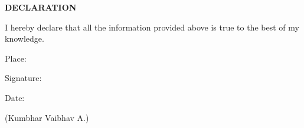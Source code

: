 \documentclass{article}
\begin{document}
\begin{framed}
	\large{\textbf{DECLARATION}}
\end{framed}
	\Large{I hereby declare that all the information provided above is true to the best of my knowledge. }

\begin{flushleft}Place:
\end{flushleft}
\begin{flushright}Signature:
\end{flushright}


\begin{flushleft}Date:
\end{flushleft}
\begin{flushright}
 (Kumbhar Vaibhav A.)
\end{flushright}
\end{document}
